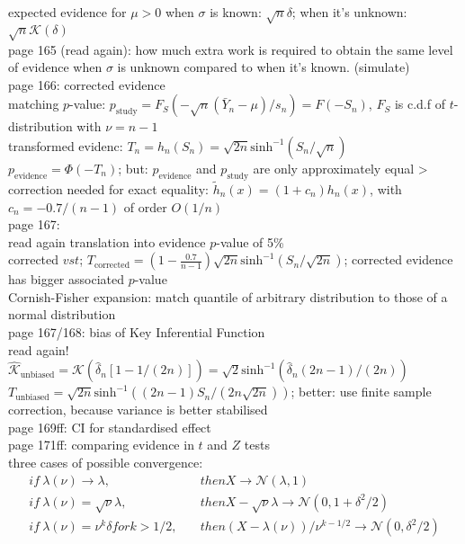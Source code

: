 expected evidence for $\mu > 0$ when $\sigma$ is known: $\sqrt{n}\delta$; when it's unknown: $\sqrt{n}\mathcal{K}(\delta)$\\

page 165 (read again): how much extra work is required to obtain the same level of evidence when $\sigma$ is unknown compared to when it's known. (simulate)\\

page 166: corrected evidence\\
matching $p$-value: $p_\text{study} = F_S(-\sqrt{n}(\bar{Y}_n-\mu)/s_n)=F(-S_n)$, $F_S$ is c.d.f of $t$-distribution with $\nu = n-1$\\
transformed evidenc: $T_n = h_n(S_n) = \sqrt{2n}\text{sinh}^{-1}(S_n/\sqrt{n})$\\
$p_{\text{evidence}}=\Phi(-T_n)$; but: $p_{\text{evidence}}$ and $p_{\text{study}}$ are only approximately equal > correction needed for exact equality: $\tilde{h}_n(x)=(1+c_n)h_n(x)$, with $c_n = -0.7/(n-1)$ of order $O(1/n)$\\
page 167:\\
read again translation into evidence $p$-value of 5\%\\
corrected $vst$; $T_{\text{corrected}}=(1-\frac{0.7}{n-1})\sqrt{2n}\text{sinh}^{-1}(S_n/\sqrt{2n})$; corrected evidence has bigger associated $p$-value\\
Cornish-Fisher expansion: match quantile of arbitrary distribution to those of a normal distribution\\

page 167/168: bias of Key Inferential Function\\
read again!\\
$\hat{\mathcal{K}}_{\text{unbiased}}=\mathcal{K}(\hat{\delta}_n[1-1/(2n)])=\sqrt{2}\text{sinh}^{-1}(\hat{\delta}_n(2n-1)/(2n))$\\
$T_{\text{unbiased}}=\sqrt{2n}\text{sinh}^{-1}((2n-1)S_n/(2n\sqrt{2n}))$; better: use finite sample correction, because variance is better stabilised\\

page 169ff: CI for standardised effect\\

page 171ff: comparing evidence in $t$ and $Z$ tests\\
three cases of possible convergence: 
\begin{align*}
    if\: \lambda(\nu) \rightarrow \lambda, \quad &then X \rightarrow \mathcal{N}(\lambda,1)\\
    if\: \lambda(\nu) = \sqrt{\nu}\lambda, \quad &then X-\sqrt{\nu}\lambda \rightarrow \mathcal{N}(0,1+\delta^2/2)\\
    if\: \lambda(\nu) = \nu^k \delta for k > 1/2, \quad &then (X-\lambda(\nu))/\nu^{k-1/2} \rightarrow \mathcal{N}(0,\delta^2/2)\\
\end{align*}

